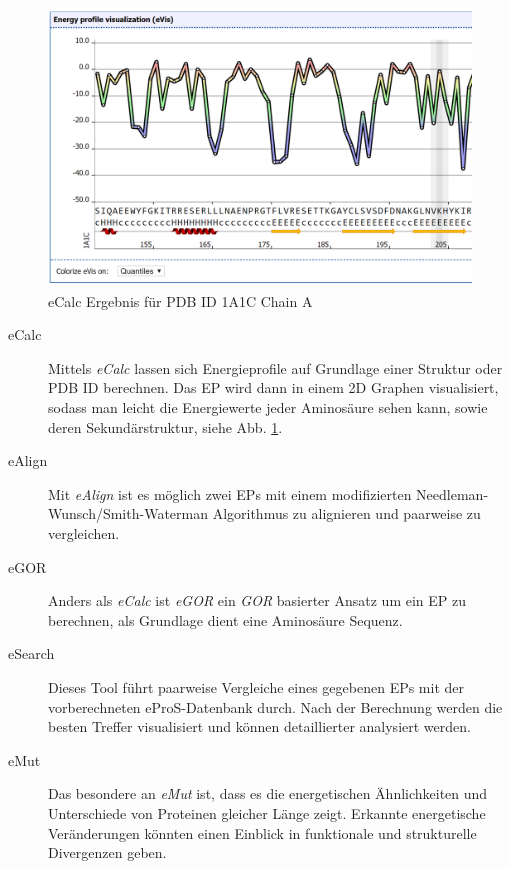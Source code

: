 \begin{figure}
\includegraphics[width=.95\textwidth]{images/ePros.png}
\caption{eCalc Ergebnis für PDB ID 1A1C Chain A}
\label{fig:epros}
\end{figure}

\begin{description}
\item[eCalc]
Mittels \emph{eCalc} lassen sich Energieprofile auf Grundlage einer Struktur oder PDB ID berechnen. Das EP wird dann in einem 2D Graphen visualisiert, sodass man leicht die Energiewerte jeder Aminosäure sehen kann, sowie deren Sekundärstruktur, siehe Abb. \ref{fig:epros}.
\item[eAlign]
Mit \emph{eAlign} ist es möglich zwei EPs mit einem modifizierten Needleman-Wunsch/Smith-Waterman Algorithmus zu alignieren und paarweise zu vergleichen.
\item[eGOR]
Anders als \emph{eCalc} ist \emph{eGOR} ein \emph{GOR}\cite{Garnier.1996} basierter Ansatz um ein EP zu berechnen, als Grundlage dient eine Aminosäure Sequenz.
\item[eSearch]
Dieses Tool führt paarweise Vergleiche eines gegebenen EPs mit der vorberechneten eProS-Datenbank durch. Nach der Berechnung werden die besten Treffer visualisiert und können detaillierter analysiert werden.
\item[eMut]
Das besondere an \emph{eMut} ist, dass es die energetischen Ähnlichkeiten und Unterschiede von Proteinen gleicher Länge zeigt. Erkannte energetische Veränderungen könnten einen Einblick in funktionale und strukturelle Divergenzen geben.
\end{description}


